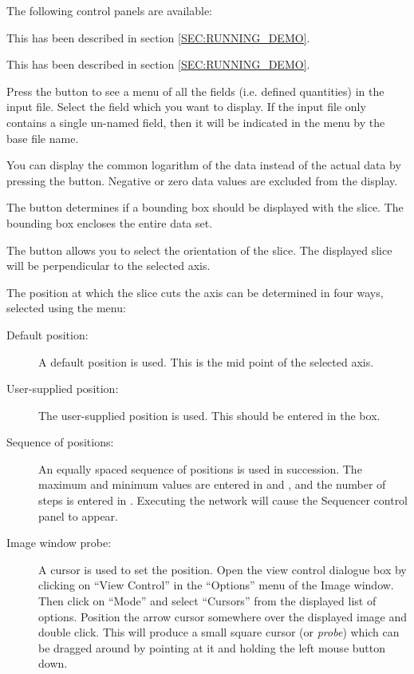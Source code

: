 The following control panels are available:
\begin{description}

This has been described in section \ref{SEC:RUNNING_DEMO}.

This has been described in section \ref{SEC:RUNNING_DEMO}.

Press the  button to see a menu of all the
fields (i.e. defined quantities) in the input file. Select the field
which you want to display.
If the input file only contains a single un-named field, then it will be
indicated in the menu by the base file name.

You can display the common logarithm of the data instead of the actual
data by pressing the  button.
Negative or zero data values are excluded from the display.


The  button determines if a bounding box should be
displayed with the slice. The bounding box encloses the entire data set.

The  button allows you to select the orientation of the
slice. The displayed slice will be perpendicular to the selected axis.

The position at which the slice cuts the axis can be determined in four
ways, selected using the  menu:

\begin{description}

\item [Default position:] A default position is used. This is the mid point
of the selected axis.

\item [User-supplied position:] The user-supplied position is used. This
should be entered in the  box.

\item [Sequence of positions:] An equally spaced sequence of positions is used
in succession. The maximum and minimum  values are entered in  and , and the number of steps is entered
in .
Executing the network will cause the Sequencer control panel to appear.

\item [Image window probe:] A cursor is used to set the position. Open the
view control dialogue box by clicking on ``View Control'' in the
``Options'' menu of the Image window.  Then click on ``Mode'' and select
``Cursors'' from the displayed list of options.  Position the arrow cursor
somewhere over the displayed image and double click. This will produce a
small square cursor (or {\em probe}) which can be dragged around by pointing
at it and holding the left mouse button down.


\end{description}
\end{description}
